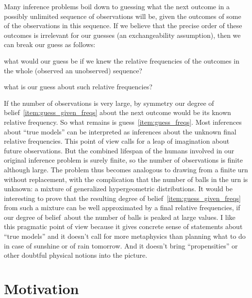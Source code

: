 \documentclass[\ifafour a4paper,12pt,\else a5paper,10pt,\fi%
onecolumn,oneside,article,%
british%
]{memoir}
\theoremstyle{remark}
\theoremstyle{innote}
\renewcommand*{\|}{\mathpunct{|}}
\newcommand*{\dob}{degree of belief}
\begin{document}
Many inference problems boil down to guessing what the next outcome in a
possibly unlimited sequence of observations will be, given the outcomes of
some of the observations in this sequence. If we believe that the precise
order of these outcomes is irrelevant for our guesses (an exchangeability
assumption), then we can break our guess as follows:
\begin{enumerate*}[(\alph*)]
\item\label{item:guess_given_freqs}what would our guess be if we knew the
  relative frequencies of the outcomes in the whole (observed an
  unobserved) sequence?
\item\label{item:guess_freqs}what is our guess about such relative frequencies?
\end{enumerate*}
If the number of observations is very large, by symmetry our
\dob~\ref{item:guess_given_freqs} about the next outcome would be its known
relative frequency. So what remains is guess~\ref{item:guess_freqs}. Most
inferences about \enquote{true models} can be interpreted as inferences
about the unknown final relative frequencies. This point of view calls for
a leap of imagination about future observations. But the combined lifespan
of the humans involved in our original inference problem is surely finite,
so the number of observations is finite although large. The problem thus
becomes analogous to drawing from a finite urn without replacement, with
the complication that the number of balls in the urn is unknown: a mixture
of generalized hypergeometric distributions. It would be interesting to
prove that the resulting \dob~\ref{item:guess_given_freqs} from such a
mixture can be well approximated by a final relative frequencies, if our
\dob\ about the number of balls is peaked at large values. I like this
pragmatic point of view because it gives concrete sense of statements about
\enquote{true models} and it doesn't call for more metaphysics than
planning what to do in case of sunshine or of rain tomorrow. And it doesn't
bring \enquote{propensities} or other doubtful physical notions into the
picture.



\section{Motivation}
\label{sec:motivation}
\end{document}
